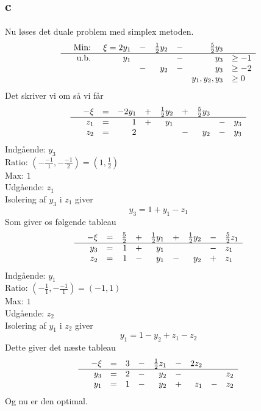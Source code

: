 \documentclass[12pt]{article}
\begin{document}
\subsection*{c}
Nu løses det duale problem med simplex metoden.
\begin{equation}
\begin{array}{rrrrrrrl}
&\text{Min: } &\xi=2y_1 &- &\frac{1}{2}y_2 &- &\frac{5}{2}y_3 & \\
\hline
&\text{u.b. } &y_1 & & &- &y_3 &\geq -1 \\
& & &- &y_2 &- &y_3 &\geq -2 \\
& & & & & &y_1,y_2,y_3 &\geq 0
\end{array}
\end{equation}
Det skriver vi om så vi får
\begin{equation}
\begin{array}{rrrrrrrrrl}
&-\xi&=&-2y_1 &+ &\frac{1}{2}y_2 &+ &\frac{5}{2}y_3& \\
\hline
&z_1&=&1&+&y_1&&&-&y_3 \\
&z_2&=&2&&&-&y_2 &- &y_3  \\
\end{array}
\end{equation}
Indgående: $y_3$ \\
Ratio: $(-\frac{-1}{1},-\frac{-1}{2})=(1,\frac{1}{2})$ \\
Max: $1$ \\
Udgående: $z_1$ \\
Isolering af $y_3$ i $z_1$ giver
$$y_3=1+y_1-z_1$$
Som giver os følgende tableau
\begin{equation}
\begin{array}{rrrrrrrrrl}
&-\xi&=&\frac{5}{2}&+&\frac{1}{2}y_1 &+&\frac{1}{2}y_2&- &\frac{5}{2}z_1 \\
\hline
&y_3&=&1&+&y_1&&&-&z_1 \\
&z_2&=&1&-&y_1&-&y_2&+ &z_1  \\
\end{array}
\end{equation}
Indgående: $y_1$ \\
Ratio: $(-\frac{1}{1},-\frac{-1}{1})=(-1,1)$ \\
Max: $1$ \\
Udgående: $z_2$ \\
Isolering af $y_1$ i $z_2$ giver
$$y_1=1-y_2+z_1-z_2$$
Dette giver det næste tableau
\begin{equation}
\begin{array}{rrrrrrrrrl}
&-\xi&=&3&-&\frac{1}{2}z_1 &-&2z_2& & \\
\hline
&y_3&=&2&-&y_2&-&&&z_2 \\
&y_1&=&1&-&y_2&+&z_1&- &z_2  \\
\end{array}
\end{equation}
Og nu er den optimal.
\end{document}
